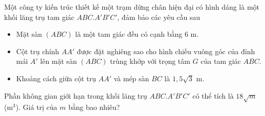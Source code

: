 \begin{ex}%
	Một công ty kiến trúc thiết kế một trạm dừng chân hiện đại có hình dáng là một khối lăng trụ tam giác $ABC.A'B'C'$, đảm bảo các yêu cầu sau
	\begin{itemize}
		\item Mặt sàn $(ABC)$ là một tam giác đều có cạnh bằng $6$ m.
		\item Cột trụ chính $AA'$ được đặt nghiêng sao cho hình chiếu vuông góc của đỉnh mái $A'$ lên mặt sàn $(ABC)$ trùng khớp với trọng tâm $G$ của tam giác $ABC$.
		\item Khoảng cách giữa cột trụ $AA'$ và mép sàn $BC$ là $1{,}5\sqrt{3}$ m.
	\end{itemize}
	Phần không gian giới hạn trong khối lăng trụ $ABC.A'B'C'$ có thể tích là $18\sqrt{m}$ (m$^3$). Giá trị của $m$ bằng bao nhiêu?
\end{ex}
